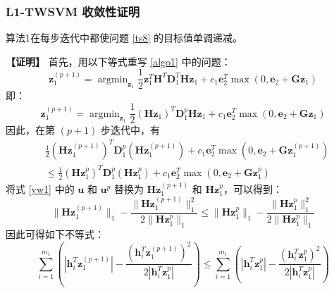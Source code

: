 \documentclass{beamer}
\begin{document}
\begin{frame}[allowframebreaks]
\frametitle{L1-TWSVM 收敛性证明}
\begin{theorem}
算法1在每步迭代中都使问题 \eqref{ts8} 的目标值单调递减。
\end{theorem}

\textbf{【证明】}
首先，用以下等式重写 \eqref{algo1} 中的问题：
\begin{equation}
\mathbf{z}^{(p+1)}_{1}=\mathop{\arg\min}_{\mathbf{z}_{1}}
\frac{1}{2}\mathbf{z}^{T}_{1}\mathbf{H}^{T}\mathbf{D}^{T}_{1}\mathbf{H}\mathbf{z}_{1}+
c_{1}\mathbf{e}^{T}_{2}\mathop{\max}(0,\mathbf{e}_{2}+\mathbf{Gz}_{1})
\label{yw3}
\end{equation}
即：
\begin{equation}
\mathbf{z}^{(p+1)}_{1}=\mathop{\arg\min}_{\mathbf{z}_{1}}
\frac{1}{2}(\mathbf{Hz}_{1})^{T}\mathbf{D}^{p}_{1}\mathbf{Hz}_{1}+
c_{1}\mathbf{e}^{T}_{2}\mathop{\max}(0,\mathbf{e}_{2}+\mathbf{Gz}_{1})
\label{yw4}
\end{equation}
因此，在第 $(p+1)$ 步迭代中，有
\begin{equation}
\begin{aligned}
&\frac{1}{2}(\mathbf{Hz}^{(p+1)}_{1})^{T}\mathbf{D}^{p}_{1}(\mathbf{Hz}^{(p+1)}_{1})+
c_{1}\mathbf{e}^{T}_{2}\mathop{\max}(0,\mathbf{e}_{2}+\mathbf{Gz}^{(p+1)}_{1})\\
&\le\frac{1}{2}(\mathbf{Hz}^{p}_{1})^{T}\mathbf{D}^{p}_{1}(\mathbf{Hz}^{p}_{1})+
c_{1}\mathbf{e}^{T}_{2}\mathop{\max}(0,\mathbf{e}_{2}+\mathbf{Gz}^{p}_{1})
\end{aligned}
\label{yw5}
\end{equation}
将式 \eqref{yw1} 中的 $\mathbf{u}$ 和 $\mathbf{u}^p$ 替换为 $\mathbf{Hz}^{(p+1)}_{1}$ 和 $\mathbf{Hz}^{p}_{1}$，可以得到：
\begin{equation}
\|\mathbf{Hz}^{(p+1)}_{1}\|_{1}-\frac{\|\mathbf{Hz}^{(p+1)}_{1}\|^{2}_{1}}{2\|\mathbf{Hz}^{p}_{1}\|_{1}}\le
\|\mathbf{Hz}^{p}_{1}\|_{1}-\frac{\|\mathbf{Hz}^{p}_{1}\|^{2}_{1}}{2\|\mathbf{Hz}^{p}_{1}\|_{1}}
\label{yw6}
\end{equation}
因此可得如下不等式：
\begin{equation}
\sum^{m_1}_{i=1}(\left|\mathbf{h}^{T}_{i}\mathbf{z}^{(p+1)}_1\right|-
\frac{(\mathbf{h}^{T}_{i}\mathbf{z}^{(p+1)}_1)^2}
{2\left|\mathbf{h}^{T}_{i}\mathbf{z}^{p}_{1}\right|})\le
\sum^{m_1}_{i=1}(\left|\mathbf{h}^{T}_{i}\mathbf{z}^{p}_1\right|-
\frac{(\mathbf{h}^{T}_{i}\mathbf{z}^{p}_1)^2}
{2\left|\mathbf{h}^{T}_{i}\mathbf{z}^{p}_{1}\right|})
\label{yw7}
\end{equation}

\end{frame}
\end{document}
